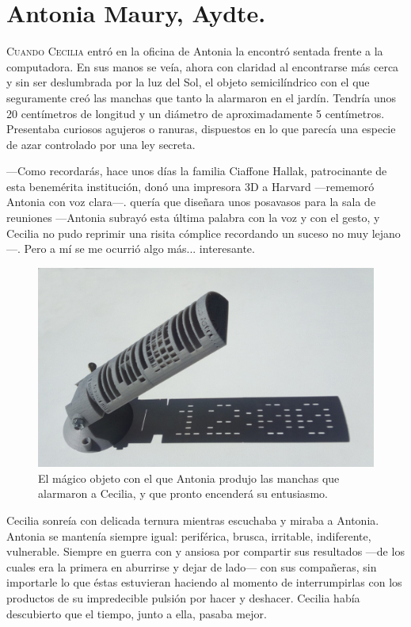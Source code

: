 \chapter{Antonia Maury, Aydte.}
\label{cap:antonia}

\lettrine[lines=2]{C}{uando Cecilia} entró en la oficina de Antonia la
encontró sentada frente a la computadora. En sus manos se veía, ahora
con claridad al encontrarse más cerca y sin ser deslumbrada por la luz
del Sol, el objeto semicilíndrico con el que seguramente creó las
manchas que tanto la alarmaron en el jardín. Tendría unos 20
centímetros de longitud y un diámetro de aproximadamente 5
centímetros. Presentaba curiosos agujeros o ranuras, dispuestos en lo
que parecía una especie de azar controlado por una ley secreta.

---Como recordarás, hace unos días la familia Ciaffone Hallak,
patrocinante de esta benemérita institución, donó una impresora 3D a
Harvard ---rememoró Antonia con voz clara---.  \director{} quería que
diseñara unos posavasos para la sala de reuniones ---Antonia subrayó
esta última palabra con la voz y con el gesto, y Cecilia no pudo
reprimir una risita cómplice recordando un suceso no muy
lejano---. Pero a mí se me ocurrió algo más... interesante.

\begin{figure}[t]
  \centering
  \includegraphics[width=\textwidth]{imagenes/reloj-equinoccio}
  \caption{El mágico objeto con el que Antonia produjo las manchas que
    alarmaron a Cecilia, y que pronto encenderá su
    entusiasmo.}%
  \label{fig:reloj-equinoccio}
\end{figure}

Cecilia sonreía con delicada ternura mientras escuchaba y miraba a
Antonia. Antonia se mantenía siempre igual: periférica, brusca,
irritable, indiferente, vulnerable. Siempre en guerra con \director{}
y ansiosa por compartir sus resultados ---de los cuales era la primera
en aburrirse y dejar de la\-do--- con sus compañeras, sin importarle
lo que éstas estuvieran haciendo al momento de interrumpirlas con los
productos de su impredecible pulsión por hacer y deshacer. Cecilia
había descubierto que el tiempo, junto a ella, pasaba mejor.



